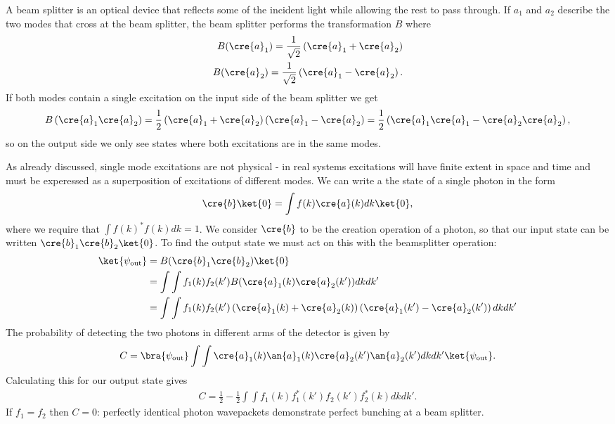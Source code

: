 A beam splitter is an optical device that reflects some of the incident light while allowing the rest to pass through. If  $a_1$ and $a_2$ describe the two modes that cross at the beam splitter, the beam splitter performs the transformation $B$ where
\begin{align}
  B (\cre{a}_{1}) = \frac{1}{\sqrt{2}} \left(\cre{a}_{1} + \cre{a}_{2}\right) \\
  B (\cre{a}_{2}) = \frac{1}{\sqrt{2}} \left(\cre{a}_{1} - \cre{a}_{2}\right).
\end{align}
If both modes contain a single excitation on the input side of the beam splitter we get
\begin{align}
  B\left(\cre{a}_{1}\cre{a}_{2}\right) = \frac{1}{2}\left(\cre{a}_{1} + \cre{a}_{2}\right) \left(\cre{a}_{1} - \cre{a}_{2}\right) = \frac{1}{2}\left(\cre{a}_{1}\cre{a}_{1} - \cre{a}_{2}\cre{a}_{2}\right),
\end{align}
so on the output side we only see states where both excitations are in the same modes.

As already discussed, single mode excitations are not physical - in real systems excitations will have finite extent in space and time and must be experessed as a superposition of excitations of different modes. We can write a the state of a single photon in the form
\begin{align}
  \cre{b}\ket{0} = \int f(k) \cre{a}(k) dk\ket{0},
\end{align}
where we require that $\int f(k)^* f(k) dk = 1$. We consider $\cre{b}$ to be the creation operation of a photon, so that our input state can be written $\cre{b}_1\cre{b}_2\ket{0}$. To find the output state we must act on this with the beamsplitter operation:
\begin{align}
  \ket{\psi_\text{out}} &= B(\cre{b}_1 \cre{b}_2)\ket{0}\\
  & = \int \int f_1(k)f_2(k') B(\cre{a}_1(k) \cre{a}_2(k')) dkdk' \\
  & = \int \int f_1(k)f_2(k') \left(\cre{a}_{1}(k) + \cre{a}_{2}(k)\right) \left(\cre{a}_{1}(k') - \cre{a}_{2}(k')\right)  dkdk' \\
\end{align}
The probability of detecting the two photons in different arms of the detector is given by
\begin{align}
  C = \bra{\psi_\text{out}} \int\int \cre{a}_1(k)\an{a}_1(k) \cre{a}_2(k')\an{a}_2(k') dk dk'\ket{\psi_\text{out}}.
\end{align}
Calculating this for our output state gives
\begin{align}
  C = \frac{1}{2} - \frac{1}{2}\int\int f_1(k)f_1^*(k')f_2(k')f_2^*(k) dk dk'.
\end{align}
If $f_1 = f_2$ then $C=0$: perfectly identical photon wavepackets demonstrate perfect bunching at a beam splitter. 

